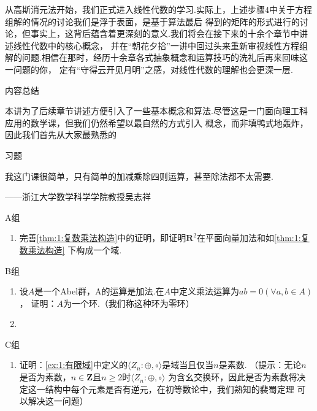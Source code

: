 从高斯消元法开始，我们正式进入线性代数的学习.实际上，上述步骤4中关于方程组解的情况的讨论我们是浮于表面，是基于算法最后
得到的矩阵的形式进行的讨论，但事实上，这背后蕴含着更深刻的意义.我们将会在接下来的十余个章节中讲述线性代数中的核心概念，
并在``朝花夕拾''一讲中回过头来重新审视线性方程组解的问题.相信在那时，经历十余章各式抽象概念和运算技巧的洗礼后再来回味这一问题的你，
定有``守得云开见月明''之感，对线性代数的理解也会更深一层.

\vspace{2ex}
\centerline{\heiti \Large 内容总结}
\vspace{2ex}

本讲为了后续章节讲述方便引入了一些基本概念和算法.尽管这是一门面向理工科应用的数学课，但我们仍然希望以最自然的方式引入
概念，而非填鸭式地轰炸，因此我们首先从大家最熟悉的

\centerline{\heiti \Large 习题}
\vspace{2ex}
{\kaishu 我这门课很简单，只有简单的加减乘除四则运算，甚至除法都不太需要.}
\begin{flushright}
    \kaishu
    ——浙江大学数学科学学院教授吴志祥
\end{flushright}
\centerline{\heiti A组}
\begin{enumerate}
    \item 完善\autoref{thm:1:复数乘法构造}中的证明，即证明$\mathbf{R}^2$在平面向量加法和如\autoref{thm:1:复数乘法构造}
    下构成一个域.
\end{enumerate}
\centerline{\heiti B组}
\begin{enumerate}
    \item 设$A$是一个Abel群，A的运算是加法.在$A$中定义乘法运算为$ab=0(\forall a,b\in A)$，
    证明：$A$为一个环.（我们称这种环为零环）
    \item 
\end{enumerate}
\centerline{\heiti C组}
\begin{enumerate}
    \item 证明：\autoref{ex:1:有限域}中定义的$\langle Z_n:\oplus,\circ\rangle$是域当且仅当$n$是素数.
    （提示：无论$n$是否为素数，$n\in\mathbf{Z}$且$n\geqslant 2$时$\langle Z_n:\oplus,\circ\rangle$
    为含幺交换环，因此是否为素数将决定这一结构中每个元素是否有逆元，在初等数论中，我们熟知的裴蜀定理
    可以解决这一问题）
\end{enumerate}
